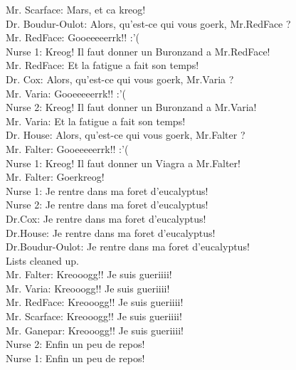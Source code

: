 {  Mr. Scarface: Mars, et ca kreog!\\
  Dr. Boudur-Oulot: Alors, qu'est-ce qui vous goerk, Mr.RedFace ?\\
  Mr. RedFace: Gooeeeeerrk!! :'(\\
  Nurse 1: Kreog! Il faut donner un Buronzand a Mr.RedFace!\\
  Mr. RedFace: Et la fatigue a fait son temps!\\
  Dr. Cox: Alors, qu'est-ce qui vous goerk, Mr.Varia ?\\
  Mr. Varia: Gooeeeeerrk!! :'(\\
  Nurse 2: Kreog! Il faut donner un Buronzand a Mr.Varia!\\
  Mr. Varia: Et la fatigue a fait son temps!\\
  Dr. House: Alors, qu'est-ce qui vous goerk, Mr.Falter ?\\
  Mr. Falter: Gooeeeeerrk!! :'(\\
  Nurse 1: Kreog! Il faut donner un Viagra a Mr.Falter!\\
  Mr. Falter: Goerkreog!\\
  Nurse 1: Je rentre dans ma foret d'eucalyptus!\\
  Nurse 2: Je rentre dans ma foret d'eucalyptus!\\
  Dr.Cox: Je rentre dans ma foret d'eucalyptus!\\
  Dr.House: Je rentre dans ma foret d'eucalyptus!\\
  Dr.Boudur-Oulot: Je rentre dans ma foret d'eucalyptus!\\
  Lists cleaned up.\\
  Mr. Falter: Kreooogg!! Je suis gueriiii!\\
  Mr. Varia: Kreooogg!! Je suis gueriiii!\\
  Mr. RedFace: Kreooogg!! Je suis gueriiii!\\
  Mr. Scarface: Kreooogg!! Je suis gueriiii!\\
  Mr. Ganepar: Kreooogg!! Je suis gueriiii!\\
  Nurse 2: Enfin un peu de repos!\\
  Nurse 1: Enfin un peu de repos!
}
